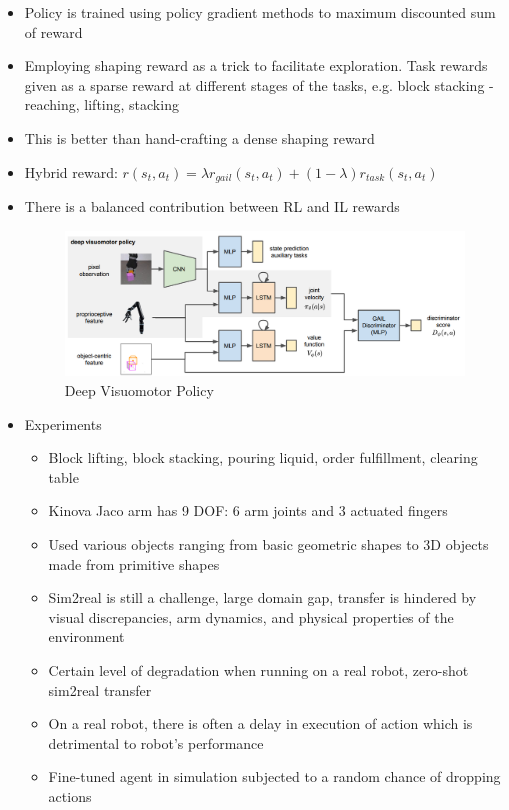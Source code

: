 \begin{itemize}
  \item Policy is trained using policy gradient methods to maximum discounted sum of reward
  \item Employing shaping reward as a trick to facilitate exploration. Task rewards given as a sparse reward at different stages of the tasks, e.g. block stacking - reaching, lifting, stacking
  \item This is better than hand-crafting a dense shaping reward
  \item Hybrid reward: $r(s_{t}, a_{t}) = \lambda r_{gail}(s_{t}, a_{t}) + (1-\lambda) r_{task}(s_{t}, a_{t})$
  \item There is a balanced contribution between RL and IL rewards
  \begin{figure}[H]
    \caption{Deep Visuomotor Policy}
    \centering
    \includegraphics[width=\textwidth]{../../imgs/visuomotor_skills.png}
  \end{figure}
  \item Experiments
  \begin{itemize}
    \item Block lifting, block stacking, pouring liquid, order fulfillment, clearing table
    \item Kinova Jaco arm has 9 DOF: 6 arm joints and 3 actuated fingers
    \item Used various objects ranging from basic geometric shapes to 3D objects made from primitive shapes
    \item Sim2real is still a challenge, large domain gap, transfer is hindered by visual discrepancies, arm dynamics, and physical properties of the environment
    \item Certain level of degradation when running on a real robot, zero-shot sim2real transfer
    \item On a real robot, there is often a delay in execution of action which is detrimental to robot's performance
    \item Fine-tuned agent in simulation subjected to a random chance of dropping actions
  \end{itemize}
\end{itemize}